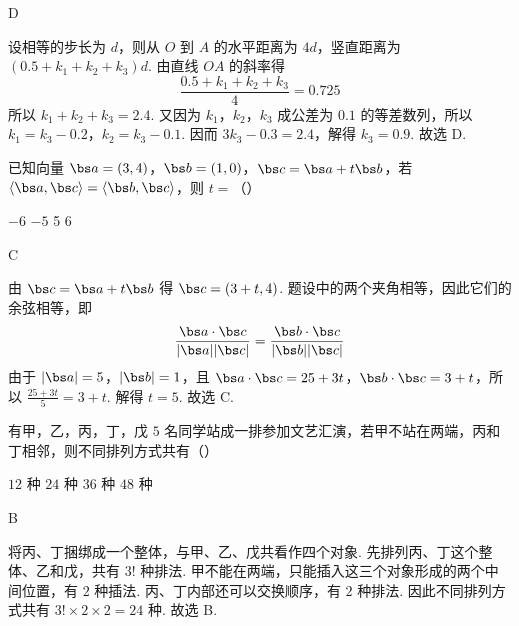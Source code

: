 \begin{answer}
D
\end{answer}

\begin{solution}
设相等的步长为 \(d\)，则从 \(O\) 到 \(A\) 的水平距离为 \(4d\)，竖直距离为 \((0.5+k_1+k_2+k_3)d\). 由直线 \(OA\) 的斜率得
\[
\frac{0.5+k_1+k_2+k_3}{4}=0.725
\]
所以 \(k_1+k_2+k_3=2.4\). 又因为 \(k_1\)，\(k_2\)，\(k_3\) 成公差为 \(0.1\) 的等差数列，所以
\(k_1=k_3-0.2\)，\(k_2=k_3-0.1\). 因而
\(3k_3-0.3=2.4\)，解得 \(k_3=0.9\).
故选 D.
\end{solution}


\begin{problem}
已知向量 \(\bs a=(3,4)\)，\(\bs b=(1,0)\)，\(\bs c=\bs a+t\bs b\)，若 \(\langle \bs a,\bs c\rangle=\langle \bs b,\bs c\rangle\)，则 \(t=\)（\quad）

\choices
    {\(-6\)}
    {\(-5\)}
    {5}
    {6}
\end{problem}

\begin{answer}
C
\end{answer}

\begin{solution}
由 \(\bs c=\bs a+t\bs b\) 得 \(\bs c=(3+t,4)\). 题设中的两个夹角相等，因此它们的余弦相等，即
\[
\frac{\bs a\cdot\bs c}{|\bs a||\bs c|}=\frac{\bs b\cdot\bs c}{|\bs b||\bs c|}
\]
由于 \(|\bs a|=5\)，\(|\bs b|=1\)，且 \(\bs a\cdot\bs c=25+3t\)，\(\bs b\cdot\bs c=3+t\)，所以
\(\frac{25+3t}{5}=3+t\). 解得 \(t=5\).
故选 C.
\end{solution}


\begin{problem}
有甲，乙，丙，丁，戊 \(5\) 名同学站成一排参加文艺汇演，若甲不站在两端，丙和丁相邻，则不同排列方式共有（\quad）

\choices
    {\(12\) 种}
    {\(24\) 种}
    {\(36\) 种}
    {\(48\) 种}
\end{problem}

\begin{answer}
B
\end{answer}

\begin{solution}
将丙、丁捆绑成一个整体，与甲、乙、戊共看作四个对象. 先排列丙、丁这个整体、乙和戊，共有 \(3!\) 种排法. 甲不能在两端，只能插入这三个对象形成的两个中间位置，有 \(2\) 种插法. 丙、丁内部还可以交换顺序，有 \(2\) 种排法. 因此不同排列方式共有
\(3!\times2\times2=24\) 种.
故选 B.
\end{solution}



